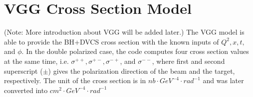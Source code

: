 \documentclass[a4paper,10.5pt]{article}
\begin{document}
% 
% 
% 

\section{VGG Cross Section Model}
  (Note: More introduction about VGG will be added later.)
  The VGG model is able to provide the BH+DVCS cross section with the known inputs of $Q^{2}, x, t,$ and $\phi$. In the double polarized case, the code computes four cross section values at the same time, i.e. $\sigma^{++}, \sigma^{+-}, \sigma^{-+}$, and $\sigma^{--}$, where first and second superscript ($\pm$) gives the polarization direction of the beam and the target, respectively. The unit of the cross section is in $nb\cdot GeV^{-4}\cdot rad^{-1}$ and was later converted into $cm^{2}\cdot GeV^{-4}\cdot rad^{-1}$
\end{document}
